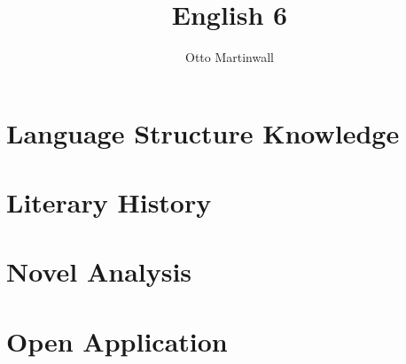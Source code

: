 

\title{English 6}
\author{Otto Martinwall}


\maketitle
\tableofcontents
\newpage

\section{Language Structure Knowledge}


\section{Literary History}


\section{Novel Analysis}


\section{Open Application}


